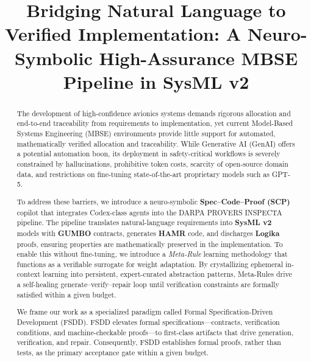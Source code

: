 \documentclass[conference]{IEEEtran}
\begin{document}
\title{Bridging Natural Language to Verified Implementation: A Neuro-Symbolic High-Assurance MBSE Pipeline in SysML v2}


\maketitle

\begin{abstract}
The development of high-confidence avionics systems demands rigorous allocation and end-to-end traceability from requirements to implementation, yet current Model-Based Systems Engineering (MBSE) environments provide little support for automated, mathematically verified allocation and traceability. While Generative AI (GenAI) offers a potential automation boon, its deployment in safety-critical workflows is severely constrained by hallucinations, prohibitive token costs, scarcity of open-source domain data, and restrictions on fine-tuning state-of-the-art proprietary models such as GPT-5.

To address these barriers, we introduce a neuro-symbolic \textbf{Spec--Code--Proof (SCP)} copilot that integrates Codex-class agents into the DARPA PROVERS INSPECTA pipeline. The pipeline translates natural-language requirements into \textbf{SysML v2} models with \textbf{GUMBO} contracts, generates \textbf{HAMR} code, and discharges \textbf{Logika} proofs, ensuring properties are mathematically preserved in the implementation. To enable this without fine-tuning, we introduce a \textit{Meta-Rule} learning methodology that functions as a verifiable surrogate for weight adaptation. By crystallizing ephemeral in-context learning into persistent, expert-curated abstraction patterns, Meta-Rules drive a self-healing generate--verify--repair loop until verification constraints are formally satisfied within a given budget.

We frame our work as a specialized paradigm called Formal Specification-Driven Development (FSDD). FSDD elevates formal specifications—contracts, verification conditions, and machine-checkable proofs—to first-class artifacts that drive generation, verification, and repair. Consequently, FSDD establishes formal proofs, rather than tests, as the primary acceptance gate within a given budget.


\end{abstract}
\end{document}

